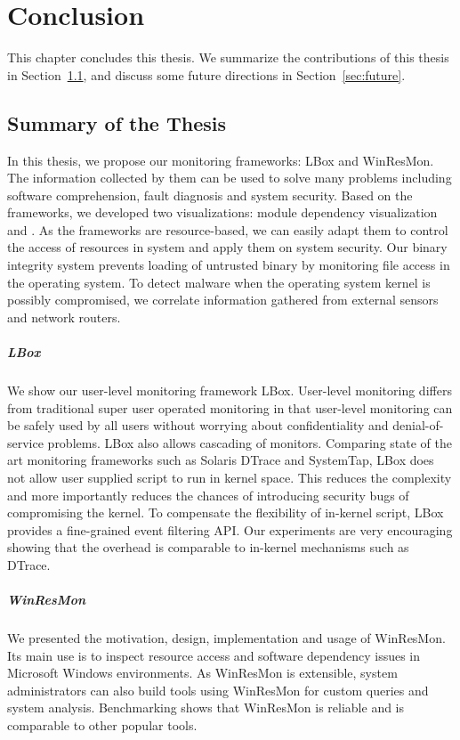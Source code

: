 \chapter{Conclusion}
\label{sec:concl}

This chapter concludes this thesis.
We summarize the contributions of this thesis in Section~\ref{sec:concl-summary},
and discuss some future directions in Section~\ref{sec:future}.

\section{Summary of the Thesis}
\label{sec:concl-summary}

In this thesis, we propose our monitoring frameworks: LBox and WinResMon.
The information collected by them can be used to solve many problems including
software comprehension, fault diagnosis and system security.
Based on the frameworks, we developed two visualizations: module dependency
visualization and .
As the frameworks are resource-based, we can easily adapt them to control
the access of resources in system and apply them on system security.
Our binary integrity system prevents loading of untrusted binary by monitoring
file access in the operating system.
To detect malware when the operating system kernel is possibly compromised,
we correlate information gathered from external sensors and network routers.

\paragraph{LBox}
We show our user-level monitoring framework LBox.
User-level monitoring differs from traditional super user operated monitoring
in that user-level monitoring can be safely used by all users without
worrying about confidentiality and denial-of-service problems.
LBox also allows cascading of monitors.
Comparing state of the art monitoring frameworks such as Solaris DTrace
and SystemTap, LBox does not allow user supplied script to run in kernel
space.
This reduces the complexity and more importantly reduces the chances
of introducing security bugs of compromising the kernel.
To compensate the flexibility of in-kernel script, LBox provides
a fine-grained event filtering API.
Our experiments are very encouraging
showing that the overhead is comparable to in-kernel
mechanisms such as DTrace.

\paragraph{WinResMon}
We presented the motivation, design, implementation and usage of
WinResMon.  Its main use is to inspect resource access and software dependency
issues in Microsoft Windows environments.  As WinResMon is extensible, system
administrators can also build tools using WinResMon for custom queries and
system analysis.  Benchmarking shows that WinResMon is reliable and is
comparable to other popular tools.


